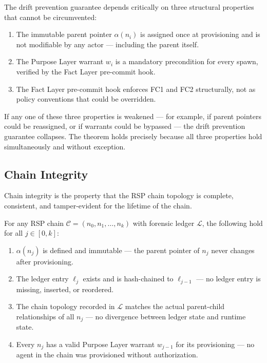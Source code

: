 The drift prevention guarantee depends critically on three structural properties that cannot be circumvented:
\begin{enumerate}
    \item The immutable parent pointer $\alpha(n_i)$ is assigned once at provisioning and is not modifiable by any actor — including the parent itself.
    \item The Purpose Layer warrant $w_i$ is a mandatory precondition for every spawn, verified by the Fact Layer pre-commit hook.
    \item The Fact Layer pre-commit hook enforces FC1 and FC2 structurally, not as policy conventions that could be overridden.
\end{enumerate}

If any one of these three properties is weakened — for example, if parent pointers could be reassigned, or if warrants could be bypassed — the drift prevention guarantee collapses. The theorem holds precisely because all three properties hold simultaneously and without exception.

\subsection{Chain Integrity}
\label{sec:rs-chain-integrity}

Chain integrity is the property that the RSP chain topology is complete, consistent, and tamper-evident for the lifetime of the chain.

\begin{property}
\label{inv:chain-integrity}
For any RSP chain $\mathcal{C} = (n_0, n_1, \ldots, n_k)$ with forensic ledger $\mathcal{L}$, the following hold for all $j \in [0, k]$:
\begin{enumerate}
    \item[(CI1)] $\alpha(n_j)$ is defined and immutable — the parent pointer of $n_j$ never changes after provisioning.
    \item[(CI2)] The ledger entry $\ell_j$ exists and is hash-chained to $\ell_{j-1}$ — no ledger entry is missing, inserted, or reordered.
    \item[(CI3)] The chain topology recorded in $\mathcal{L}$ matches the actual parent-child relationships of all $n_j$ — no divergence between ledger state and runtime state.
    \item[(CI4)] Every $n_j$ has a valid Purpose Layer warrant $w_{j-1}$ for its provisioning — no agent in the chain was provisioned without authorization.
\end{enumerate}
\end{property}

